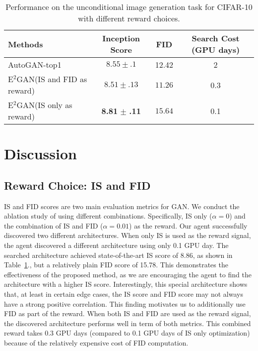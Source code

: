 \documentclass[runningheads]{llncs}
\begin{document}
\begin{table}[b!]
\begin{center}
\begin{tabular}{l|c|c|c}
Methods&Inception Score&FID&Search Cost (GPU days)\\
\hline
AutoGAN-top1~\cite{gong2019autogan}&  $8.55\pm .1 $ &12.42&2\\
\hline
E$^2$GAN(IS and FID as reward)  & $8.51 \pm .13$&$11.26$&0.3\\
\hline
E$^2$GAN(IS only as reward)  & \textbf{8.81} $\pm $ \textbf{.11} &$15.64$&0.1\\

\end{tabular}
\end{center}
\caption{Performance on the unconditional image generation task for CIFAR-10 with different reward choices.}
\label{rdr}
\end{table}
\section{Discussion} \label{AS}
\subsection{Reward Choice: IS and FID}
IS and FID scores are two main evaluation metrics for GAN. We conduct the ablation study of using different combinations. Specifically, IS only ($\alpha=0$) and the combination of IS and FID ($\alpha=0.01$) as the reward. Our agent successfully discovered two different architectures. When only IS is used as the reward signal, the agent discovered a different architecture using only 0.1 GPU day. The searched architecture achieved state-of-the-art IS score of 8.86, as shown in Table~\ref{rdr}., but a relatively plain FID score of 15.78. This demonstrates the effectiveness of the proposed method, as we are encouraging the agent to find the architecture with a higher IS score. Interestingly, this special architecture shows that, at least in certain edge cases, the IS score and FID score may not always have a strong positive correlation. This finding motivates us to additionally use FID as part of the reward. When both IS and FID are used as the reward signal, the discovered architecture performs well in term of both 
metrics. This combined reward takes 0.3 GPU days (compared to 0.1 GPU days of IS only optimization) because of the relatively expensive cost of FID computation. 
\end{document}
